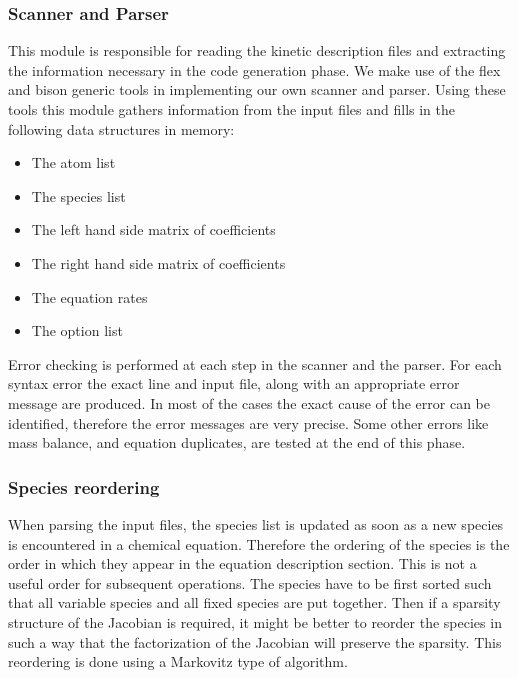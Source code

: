 \documentclass[twoside]{article}
\begin{document}
\subsubsection{Scanner and Parser}

This module is responsible for reading the kinetic description files and
extracting the information necessary in the code generation phase. We
make use of the flex and bison generic tools in implementing our own
scanner and parser. Using these tools this module gathers information
from the input files and fills in the following data structures in
memory:
%
\begin{itemize}
\item The atom list
\item The species list
\item The left hand side matrix of coefficients
\item The right hand side matrix of coefficients
\item The equation rates
\item The option list
\end{itemize}
%
Error checking is performed at each step in the scanner and the parser.
For each syntax error the exact line and input file, along with an
appropriate error message are produced. In most of the cases the exact
cause of the error can be identified, therefore the error messages are
very precise. Some other errors like mass balance, and equation
duplicates, are tested at the end of this phase.

\subsubsection{Species reordering}

When parsing the input files, the species list is updated as soon as a
new species is encountered in a chemical equation. Therefore the
ordering of the species is the order in which they appear in the
equation description section. This is not a useful order for subsequent
operations. The species have to be first sorted such that all variable
species and all fixed species are put together. Then if a sparsity
structure of the Jacobian is required, it might be better to reorder the
species in such a way that the factorization of the Jacobian will
preserve the sparsity. This reordering is done using a Markovitz type of
algorithm.
\end{document}
